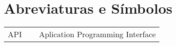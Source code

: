 
\chapter*{Abreviaturas e Símbolos}

\begin{flushleft}
\begin{tabular}{l p{0.8\linewidth}}
API & Aplication Programming Interface

\end{tabular}
\end{flushleft}

